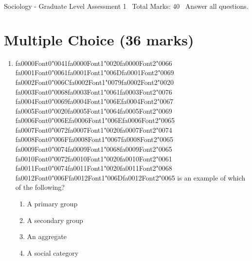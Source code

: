 \documentclass[12pt]{article}
\begin{document}
\begin{center}
Sociology - Graduate Level Assessment 1 \
Total Marks: 40 \
Answer all questions.
\end{center}

\section*{Multiple Choice (36 marks)}
\begin{enumerate}[label=\arabic*.]
\item {\csname fa0000Font0\endcsname\char"0041}{\csname fa0000Font1\endcsname\char"0020}{\csname fa0000Font2\endcsname\char"0066} {\csname fa0001Font0\endcsname\char"0061}{\csname fa0001Font1\endcsname\char"006D}{\csname fa0001Font2\endcsname\char"0069} {\csname fa0002Font0\endcsname\char"006C}{\csname fa0002Font1\endcsname\char"0079}{\csname fa0002Font2\endcsname\char"0020} {\csname fa0003Font0\endcsname\char"0068}{\csname fa0003Font1\endcsname\char"0061}{\csname fa0003Font2\endcsname\char"0076} {\csname fa0004Font0\endcsname\char"0069}{\csname fa0004Font1\endcsname\char"006E}{\csname fa0004Font2\endcsname\char"0067} {\csname fa0005Font0\endcsname\char"0020}{\csname fa0005Font1\endcsname\char"0064}{\csname fa0005Font2\endcsname\char"0069} {\csname fa0006Font0\endcsname\char"006E}{\csname fa0006Font1\endcsname\char"006E}{\csname fa0006Font2\endcsname\char"0065} {\csname fa0007Font0\endcsname\char"0072}{\csname fa0007Font1\endcsname\char"0020}{\csname fa0007Font2\endcsname\char"0074} {\csname fa0008Font0\endcsname\char"006F}{\csname fa0008Font1\endcsname\char"0067}{\csname fa0008Font2\endcsname\char"0065} {\csname fa0009Font0\endcsname\char"0074}{\csname fa0009Font1\endcsname\char"0068}{\csname fa0009Font2\endcsname\char"0065} {\csname fa0010Font0\endcsname\char"0072}{\csname fa0010Font1\endcsname\char"0020}{\csname fa0010Font2\endcsname\char"0061} {\csname fa0011Font0\endcsname\char"0074}{\csname fa0011Font1\endcsname\char"0020}{\csname fa0011Font2\endcsname\char"0068} {\csname fa0012Font0\endcsname\char"006F}{\csname fa0012Font1\endcsname\char"006D}{\csname fa0012Font2\endcsname\char"0065} is an example of which of the following?
\begin{enumerate}[label=(\alph*)]
    \item A primary group
    \item A secondary group
    \item An aggregate
    \item A social category
\end{enumerate}

\end{enumerate}
\end{document}
